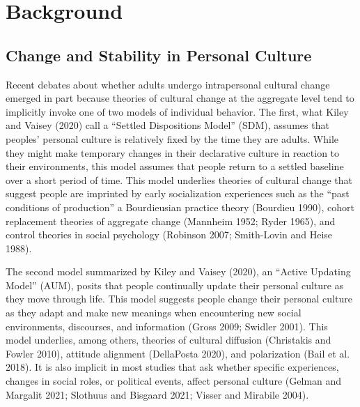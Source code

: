 \documentclass[
  12pt,
]{article}
\begin{document}
\hypertarget{background}{%
\section{Background}\label{background}}

\hypertarget{change-and-stability-in-personal-culture}{%
\subsection{Change and Stability in Personal
Culture}\label{change-and-stability-in-personal-culture}}

Recent debates about whether adults undergo intrapersonal cultural
change emerged in part because theories of cultural change at the
aggregate level tend to implicitly invoke one of two models of
individual behavior. The first, what Kiley and Vaisey (2020) call a
``Settled Dispositions Model'' (SDM), assumes that peoples' personal
culture is relatively fixed by the time they are adults. While they
might make temporary changes in their declarative culture in reaction to
their environments, this model assumes that people return to a settled
baseline over a short period of time. This model underlies theories of
cultural change that suggest people are imprinted by early socialization
experiences such as the ``past conditions of production'' a Bourdieusian
practice theory (Bourdieu 1990), cohort replacement theories of
aggregate change (Mannheim 1952; Ryder 1965), and control theories in
social psychology (Robinson 2007; Smith-Lovin and Heise 1988).

The second model summarized by Kiley and Vaisey (2020), an ``Active
Updating Model'' (AUM), posits that people continually update their
personal culture as they move through life. This model suggests people
change their personal culture as they adapt and make new meanings when
encountering new social environments, discourses, and information (Gross
2009; Swidler 2001). This model underlies, among others, theories of
cultural diffusion (Christakis and Fowler 2010), attitude alignment
(DellaPosta 2020), and polarization (Bail et al. 2018). It is also
implicit in most studies that ask whether specific experiences, changes
in social roles, or political events, affect personal culture (Gelman
and Margalit 2021; Slothuus and Bisgaard 2021; Visser and Mirabile
2004).
\end{document}
